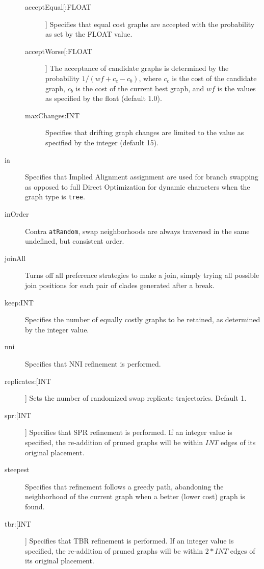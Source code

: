 \begin{description}
			\begin{description}
			
			\item[acceptEqual[:FLOAT]] Specifies that equal cost graphs are accepted with the
			probability as set by the FLOAT value. 
			
			\item[acceptWorse[:FLOAT]] The acceptance of candidate graphs is determined by the 
			probability $1/ (wf + c_c - c_b)$, where $c_c$ is the cost of the candidate graph, $c_b$ 
			is the cost of the current best graph, and $wf$ is the values as specified by the float 
			(default 1.0). 	
			
			\item[maxChanges:INT] Specifies that drifting graph changes are limited to the 
			value as specified by the integer (default 15).
			
			\end{description}
		
		\item[ia] Specifies that Implied Alignment \citep{Wheeler2003} assignment are used for 
		branch swapping as opposed to full Direct Optimization for dynamic characters when the 
		graph type is \texttt{tree}.
		
		\item[inOrder] Contra \texttt{atRandom}, swap neighborhoods are always traversed 
		in the same undefined, but consistent order.
		
		\item[joinAll] Turns off all preference strategies to make a join, simply trying all possible 
		join positions for each pair of clades generated after a break. 
		
		\item[keep:INT] Specifies the number of equally costly graphs to be retained, as
		determined by the integer value.		
		
		\item[nni] Specifies that NNI refinement \citep{CaminandSokal1965, Robinson1971} 
		is performed.
		
		\item[replicates:[INT]] Sets the number of randomized swap replicate trajectories. Default 1.
		
		\item[spr:[INT]] Specifies that SPR refinement \citep{Dayhoff1969} is performed. If an 
		integer value is specified, the re-addition of pruned graphs will be within $INT$ 
		edges of its original placement.
		
		\item[steepest] Specifies that refinement follows a greedy path, abandoning the 
		neighborhood of the current graph when a better (lower cost) graph is found.  		
		
		\item[tbr:[INT]] Specifies that TBR refinement \citep{Farris1988, swofford1990a} 
		is performed. If an integer value is specified, the re-addition of pruned graphs 
		will be within $2 * INT$ edges of its original placement.
		\end{description}	
		
